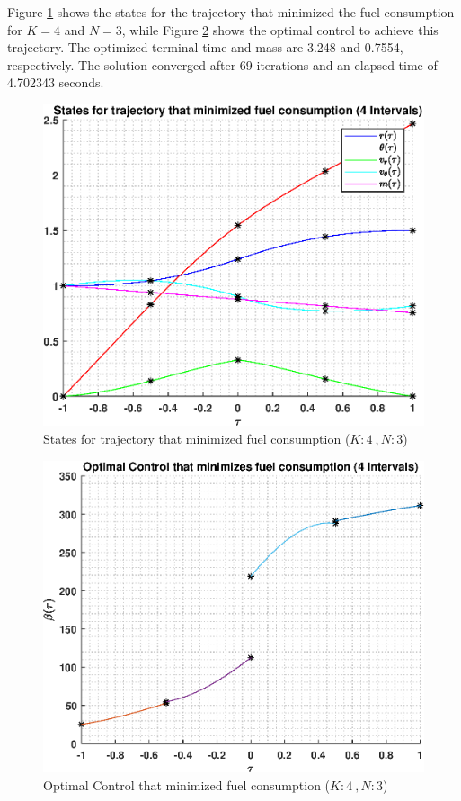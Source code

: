\documentclass[]{article}
\begin{document}
\vspace{2mm}\newline 
Figure \ref{fig:directStatesK4Poly3} shows the states for the trajectory that minimized the fuel consumption for \(K = 4\) and  \(N = 3\), while Figure \ref{fig:directControlK4Poly3} shows the optimal control to achieve this trajectory. The optimized terminal time and mass are 3.248 and 0.7554, respectively. The solution converged after 69 iterations and an elapsed time of 4.702343 seconds.
\begin{figure}
	\centering
	\includegraphics[scale=0.75]{directStatesK4Poly3.eps}
	\caption{States for trajectory that minimized fuel consumption (\(K:4\ , N:3\))}
	\label{fig:directStatesK4Poly3}
\end{figure}
\begin{figure}
	\centering
	\includegraphics[scale=0.75]{directControlK4Poly3.eps}
	\caption{Optimal Control that minimized fuel consumption (\(K:4\ , N:3\))}
	\label{fig:directControlK4Poly3}
\end{figure}
\end{document}
